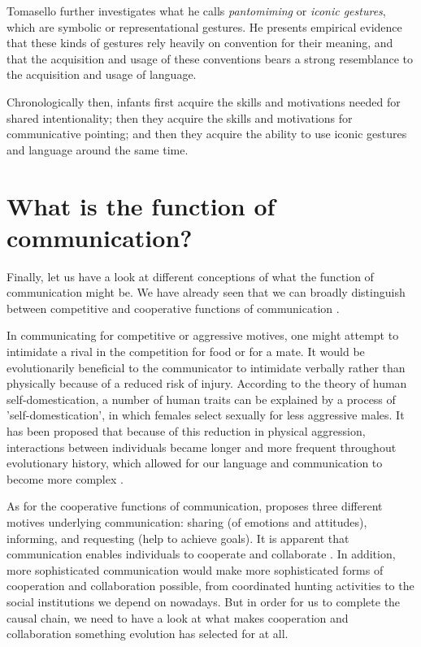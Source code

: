 Tomasello further investigates what he calls \emph{pantomiming} or \emph{iconic gestures}, which are symbolic or representational gestures. 
He presents empirical evidence that these kinds of gestures rely heavily on convention for their meaning, and that the acquisition and usage of these conventions bears a strong resemblance to the acquisition and usage of language.

Chronologically then, infants first acquire the skills and motivations needed for shared intentionality; then they acquire the skills and motivations for communicative pointing; and then they acquire the ability to use iconic gestures and language around the same time.

\section{What is the function of communication?}
\label{sec:comm:function}

Finally, let us have a look at different conceptions of what the function of communication might be. We have already seen that we can broadly distinguish between competitive and cooperative functions of communication \citep{SeyfarthCheney03}.

In communicating for competitive or aggressive motives, one might attempt to intimidate a rival in the competition for food or for a mate. It would be evolutionarily beneficial to the communicator to intimidate verbally rather than physically because of a reduced risk of injury.
According to the theory of human self-domestication, a number of human traits can be explained by a process of 'self-domestication', in which females select sexually for less aggressive males. It has been proposed that because of this reduction in physical aggression, interactions between individuals became longer and more frequent throughout evolutionary history, which allowed for our language and communication to become more complex \citep{Benitez21}.

As for the cooperative functions of communication, \citet{Tomasello08-origins} proposes three different motives underlying communication: sharing (of emotions and attitudes), informing, and requesting (help to achieve goals).
It is apparent that communication enables individuals to cooperate and collaborate . In addition, more sophisticated communication would make more sophisticated forms of cooperation and collaboration possible, from coordinated hunting activities to the social institutions we depend on nowadays.
But in order for us to complete the causal chain, we need to have a look at what makes cooperation and collaboration something evolution has selected for at all.

